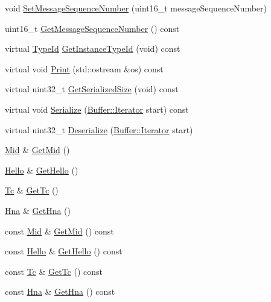 \begin{DoxyCompactItemize}
\item 
void \hyperlink{classns3_1_1olsr_1_1MessageHeader_a85bbb01a7dd265fd4c65e162e6213526}{Set\+Message\+Sequence\+Number} (uint16\+\_\+t message\+Sequence\+Number)
\item 
uint16\+\_\+t \hyperlink{classns3_1_1olsr_1_1MessageHeader_a6929fef15c2e8ddbd17fb1b24253f43e}{Get\+Message\+Sequence\+Number} () const 
\item 
virtual \hyperlink{classns3_1_1TypeId}{Type\+Id} \hyperlink{classns3_1_1olsr_1_1MessageHeader_a478ac7746149ef9a81ac26963dea5441}{Get\+Instance\+Type\+Id} (void) const 
\item 
virtual void \hyperlink{classns3_1_1olsr_1_1MessageHeader_a9ce17fc403b7333ab893c4ab5e278d8b}{Print} (std\+::ostream \&os) const 
\item 
virtual uint32\+\_\+t \hyperlink{classns3_1_1olsr_1_1MessageHeader_a37bd1eab7a239630524908b49f237313}{Get\+Serialized\+Size} (void) const 
\item 
virtual void \hyperlink{classns3_1_1olsr_1_1MessageHeader_a13dda405e2d4788dfb33c7d3264136c4}{Serialize} (\hyperlink{classns3_1_1Buffer_1_1Iterator}{Buffer\+::\+Iterator} start) const 
\item 
virtual uint32\+\_\+t \hyperlink{classns3_1_1olsr_1_1MessageHeader_ac3fa2b5b9a6798201634c494d6c44244}{Deserialize} (\hyperlink{classns3_1_1Buffer_1_1Iterator}{Buffer\+::\+Iterator} start)
\item 
\hyperlink{structns3_1_1olsr_1_1MessageHeader_1_1Mid}{Mid} \& \hyperlink{classns3_1_1olsr_1_1MessageHeader_adac2777d37a493ffc7b1622f3d9fe566}{Get\+Mid} ()
\item 
\hyperlink{structns3_1_1olsr_1_1MessageHeader_1_1Hello}{Hello} \& \hyperlink{classns3_1_1olsr_1_1MessageHeader_a2790f1e5dacd87e358cf9ee9e8725dc5}{Get\+Hello} ()
\item 
\hyperlink{structns3_1_1olsr_1_1MessageHeader_1_1Tc}{Tc} \& \hyperlink{classns3_1_1olsr_1_1MessageHeader_a468581c0f6cf0056a096c020cb6db604}{Get\+Tc} ()
\item 
\hyperlink{structns3_1_1olsr_1_1MessageHeader_1_1Hna}{Hna} \& \hyperlink{classns3_1_1olsr_1_1MessageHeader_ad3d78aa0e85df2e1a8a62abe280049ff}{Get\+Hna} ()
\item 
const \hyperlink{structns3_1_1olsr_1_1MessageHeader_1_1Mid}{Mid} \& \hyperlink{classns3_1_1olsr_1_1MessageHeader_a2eae3b9beabf582d39815925ed3a693b}{Get\+Mid} () const 
\item 
const \hyperlink{structns3_1_1olsr_1_1MessageHeader_1_1Hello}{Hello} \& \hyperlink{classns3_1_1olsr_1_1MessageHeader_a328890cfea91cd45da6d96f95f020c0b}{Get\+Hello} () const 
\item 
const \hyperlink{structns3_1_1olsr_1_1MessageHeader_1_1Tc}{Tc} \& \hyperlink{classns3_1_1olsr_1_1MessageHeader_a6209337796a7a9f3e68f422a052c15e5}{Get\+Tc} () const 
\item 
const \hyperlink{structns3_1_1olsr_1_1MessageHeader_1_1Hna}{Hna} \& \hyperlink{classns3_1_1olsr_1_1MessageHeader_a1f3f00b8638d15770e61d78fba43f106}{Get\+Hna} () const 
\end{DoxyCompactItemize}

